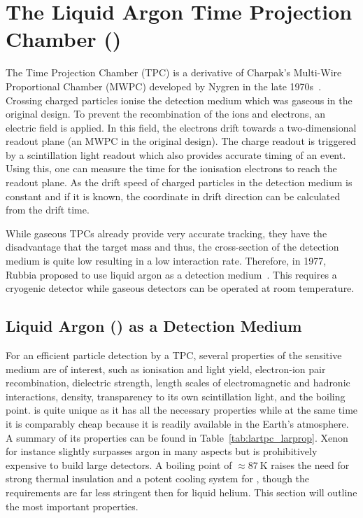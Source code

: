 \chapter{The Liquid Argon Time Projection Chamber (\lartpc{})}
\label{chap:lartpc}

The Time Projection Chamber (TPC) is a derivative of Charpak's Multi-Wire Proportional Chamber (MWPC)\cite{mwpc} developed by Nygren in the late 1970s~\cite{nygrenTPC}.
Crossing charged particles ionise the detection medium which was gaseous in the original design.
To prevent the recombination of the ions and electrons, an electric field is applied.
In this field, the electrons drift towards a two-dimensional readout plane (an MWPC in the original design).
The charge readout is triggered by a scintillation light readout which also provides accurate timing of an event.
Using this, one can measure the time for the ionisation electrons to reach the readout plane.
As the drift speed of charged particles in the detection medium is constant and if it is known, the coordinate in drift direction can be calculated from the drift time.

While gaseous TPCs already provide very accurate tracking, they have the disadvantage that the target mass and thus, the cross-section of the detection medium is quite low resulting in a low interaction rate.
Therefore, in 1977, Rubbia proposed to use liquid argon as a detection medium~\cite{lartpc}.
This requires a cryogenic detector while gaseous detectors can be operated at room temperature.


\section{Liquid Argon (\lar{}) as a Detection Medium}
\label{sec:lartpc_lar}

For an efficient particle detection by a TPC, several properties of the sensitive medium are of interest, such as ionisation and light yield, electron-ion pair recombination, dielectric strength, length scales of electromagnetic and hadronic interactions, density, transparency to its own scintillation light, and the boiling point.
\lar{} is quite unique as it has all the necessary properties while at the same time it is comparably cheap because it is readily available in the Earth's atmosphere.
A summary of its properties can be found in Table~\ref{tab:lartpc_larprop}.
Xenon for instance slightly surpasses argon in many aspects but is prohibitively expensive to build large detectors.
A boiling point of $\approx \SI{87}{\kelvin}$ raises the need for strong thermal insulation and a potent cooling system for \lar{}, though the requirements are far less stringent then for liquid helium.
This section will outline the most important \lar{} properties.

